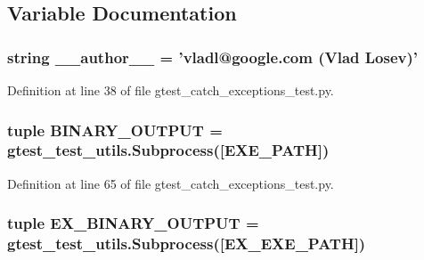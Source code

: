 \subsection{\-Variable \-Documentation}
\hypertarget{namespacegtest__catch__exceptions__test_a629d61dfe4da763164a4d1a2d85b0afd}{
\subsubsection[{\-\_\-\-\_\-author\-\_\-\-\_\-}]{\setlength{\rightskip}{0pt plus 5cm}string {\bf \-\_\-\-\_\-author\-\_\-\-\_\-} = 'vladl@google.\-com (\-Vlad \-Losev)'}}\label{dd/dbf/namespacegtest__catch__exceptions__test_a629d61dfe4da763164a4d1a2d85b0afd}


\-Definition at line 38 of file gtest\-\_\-catch\-\_\-exceptions\-\_\-test.\-py.

\hypertarget{namespacegtest__catch__exceptions__test_a56bdc6950eebf373957d0626ee2b1456}{
\subsubsection[{\-B\-I\-N\-A\-R\-Y\-\_\-\-O\-U\-T\-P\-U\-T}]{\setlength{\rightskip}{0pt plus 5cm}tuple {\bf \-B\-I\-N\-A\-R\-Y\-\_\-\-O\-U\-T\-P\-U\-T} = {\bf gtest\-\_\-test\-\_\-utils.\-Subprocess}(\mbox{[}{\bf \-E\-X\-E\-\_\-\-P\-A\-T\-H}\mbox{]})}}\label{dd/dbf/namespacegtest__catch__exceptions__test_a56bdc6950eebf373957d0626ee2b1456}


\-Definition at line 65 of file gtest\-\_\-catch\-\_\-exceptions\-\_\-test.\-py.

\hypertarget{namespacegtest__catch__exceptions__test_a66e1c6456230fc5971eefa2eee792d12}{
\subsubsection[{\-E\-X\-\_\-\-B\-I\-N\-A\-R\-Y\-\_\-\-O\-U\-T\-P\-U\-T}]{\setlength{\rightskip}{0pt plus 5cm}tuple {\bf \-E\-X\-\_\-\-B\-I\-N\-A\-R\-Y\-\_\-\-O\-U\-T\-P\-U\-T} = {\bf gtest\-\_\-test\-\_\-utils.\-Subprocess}(\mbox{[}{\bf \-E\-X\-\_\-\-E\-X\-E\-\_\-\-P\-A\-T\-H}\mbox{]})}}\label{dd/dbf/namespacegtest__catch__exceptions__test_a66e1c6456230fc5971eefa2eee792d12}


